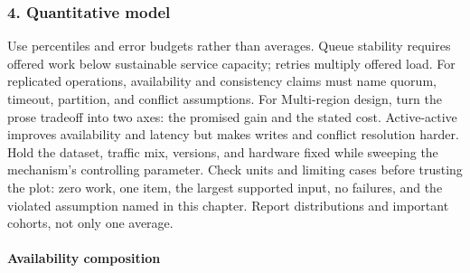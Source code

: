 \subsubsection*{4. Quantitative model}
Use percentiles and error budgets rather than averages. Queue stability requires offered work below sustainable service capacity; retries multiply offered load. For replicated operations, availability and consistency claims must name quorum, timeout, partition, and conflict assumptions.
For Multi-region design, turn the prose tradeoff into two axes: the promised gain and the stated cost. Active-active improves availability and latency but makes writes and conflict resolution harder. Hold the dataset, traffic mix, versions, and hardware fixed while sweeping the mechanism's controlling parameter.
Check units and limiting cases before trusting the plot: zero work, one item, the largest supported input, no failures, and the violated assumption named in this chapter. Report distributions and important cohorts, not only one average.
\paragraph{Availability composition}
